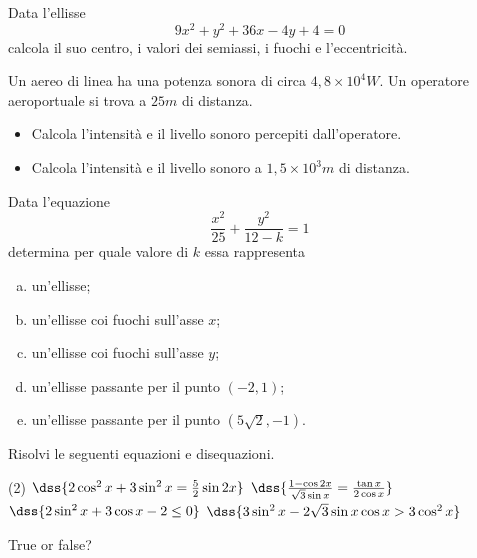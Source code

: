 \documentclass{verifica}
\begin{document}

\lineanome
\intestazionerighe

\begin{esercizi}

\item Data l'ellisse
\[
  9x^2+y^2+36x-4y+4=0
\]
calcola il suo centro, i valori dei semiassi, i fuochi e l'eccentricità.

\item Un aereo di linea ha una potenza sonora di circa
      $4,8\times 10^4\unit{W}$. Un operatore aeroportuale si trova
      a $25\unit{m}$ di distanza.
\begin{itemize}
  \item Calcola l'intensità e il livello sonoro percepiti dall'operatore.
  \item Calcola l'intensità e il livello sonoro a $1,5\times 10^3\unit{m}$
        di distanza.
\end{itemize}

\item Data l'equazione
\[
  \frac{x^2}{25}+\frac{y^2}{12-k}=1
\]
determina per quale valore di $k$ essa rappresenta
\begin{enumerate}[a)]
  \item un'ellisse;
  \item un'ellisse coi fuochi sull'asse $x$;
  \item un'ellisse coi fuochi sull'asse $y$;
  \item un'ellisse passante per il punto $(-2, 1)$;
  \item un'ellisse passante per il punto $(5\sqrt{2},-1)$.
\end{enumerate}

\item Risolvi le seguenti equazioni e disequazioni.
\begin{tasks}[after-item-skip=2em,column-sep=2em,item-indent=2em](2)
  \task $\dss{2\cos^2 x +3\sin^2 x=\frac{5}{2}\sin 2x}$
  \task $\dss{\frac{1 -\cos 2x}{\sqrt{3}\sin x}=\frac{\tan x}{2\cos x}}$
  \task $\dss{2\sin^2 x +3\cos x -2 \le 0}$
  \task $\dss{3\sin^2 x -2\sqrt{3}\sin x\cos x > 3\cos^2 x}$
\end{tasks}

\item \begin{otherlanguage}{english}
True or false?
\begin{test-verofalso}
\end{test-verofalso}
\end{otherlanguage}

\end{esercizi}
\end{document}
